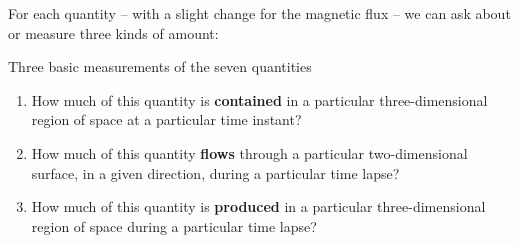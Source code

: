 \documentclass[a4paper,12pt,%
onecolumn,oneside,%
british%
]{memoir}
\renewcommand*{\|}[1][]{\nonscript\:#1\vert\nonscript\:\mathopen{}}
\begin{document}
For each quantity -- with a slight change for the magnetic flux -- we can ask about or measure three kinds of amount:
\begin{definition}{Three basic measurements of the seven quantities}\label{def:volumecontent}
  \begin{enumerate}[label={M\arabic*}.,leftmargin=3em]
  \item\label{item:meas1}How much of this quantity is \textbf{contained} in a particular three-dimensional region of space at a particular time instant?

  \item\label{item:meas2a}How much of this quantity \textbf{flows} through a particular two-dimensional surface, in a given direction, during a particular time lapse?

  \item\label{item:meas3a}How much of this quantity is \textbf{produced} in a particular three-dimensional region of space during a particular time lapse?
  \end{enumerate}
\end{definition}
%
\end{document}
